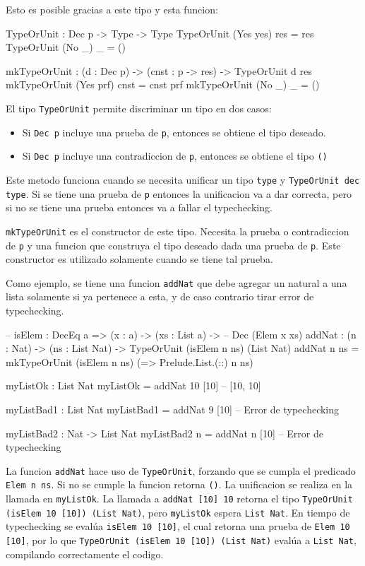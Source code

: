 Esto es posible gracias a este tipo y esta funcion:

\begin{code}
TypeOrUnit : Dec p -> Type -> Type
TypeOrUnit (Yes yes) res = res
TypeOrUnit (No _) _ = ()

mkTypeOrUnit : (d : Dec p) -> (cnst : p -> res) -> 
  TypeOrUnit d res
mkTypeOrUnit (Yes prf) cnst = cnst prf
mkTypeOrUnit (No _) _ = ()
\end{code}

El tipo \texttt{TypeOrUnit} permite discriminar un tipo en dos casos:
\begin{itemize}
\item Si \texttt{Dec p} incluye una prueba de \texttt{p}, entonces se obtiene el tipo deseado.
\item Si \texttt{Dec p} incluye una contradiccion de \texttt{p}, entonces se obtiene el tipo \texttt{()}
\end{itemize}

Este metodo funciona cuando se necesita unificar un tipo \texttt{type} y \texttt{TypeOrUnit dec type}. Si se tiene una prueba de \texttt{p} entonces la unificacion va a dar correcta, pero si no se tiene una prueba entonces va a fallar el typechecking.

\texttt{mkTypeOrUnit} es el constructor de este tipo. Necesita la prueba o contradiccion de \texttt{p} y una funcion que construya el tipo deseado dada una prueba de \texttt{p}. Este constructor es utilizado solamente cuando se tiene tal prueba.

Como ejemplo, se tiene una funcion \texttt{addNat} que debe agregar un natural a una lista solamente si ya pertenece a esta, y de caso contrario tirar error de typechecking.

\begin{code}
-- isElem : DecEq a => (x : a) -> (xs : List a) -> 
--  Dec (Elem x xs)
addNat : (n : Nat) -> (ns : List Nat) -> 
  TypeOrUnit (isElem n ns) (List Nat)
addNat n ns = mkTypeOrUnit (isElem n ns) 
  (\isElem => Prelude.List.(::) n ns)

myListOk : List Nat
myListOk = addNat 10 [10] -- [10, 10]

myListBad1 : List Nat
myListBad1 = addNat 9 [10] -- Error de typechecking

myListBad2 : Nat -> List Nat
myListBad2 n = addNat n [10] -- Error de typechecking
\end{code}

La funcion \texttt{addNat} hace uso de \texttt{TypeOrUnit}, forzando que se cumpla el predicado \texttt{Elem n ns}. Si no se cumple la funcion retorna \texttt{()}. La unificacion se realiza en la llamada en \texttt{myListOk}. La llamada a \texttt{addNat [10] 10} retorna el tipo \texttt{TypeOrUnit (isElem 10 [10]) (List Nat)}, pero \texttt{myListOk} espera \texttt{List Nat}. En tiempo de typechecking se evalúa \texttt{isElem 10 [10]}, el cual retorna una prueba de \texttt{Elem 10 [10]}, por lo que \texttt{TypeOrUnit (isElem 10 [10]) (List Nat)} evalúa a \texttt{List Nat}, compilando correctamente el codigo.


